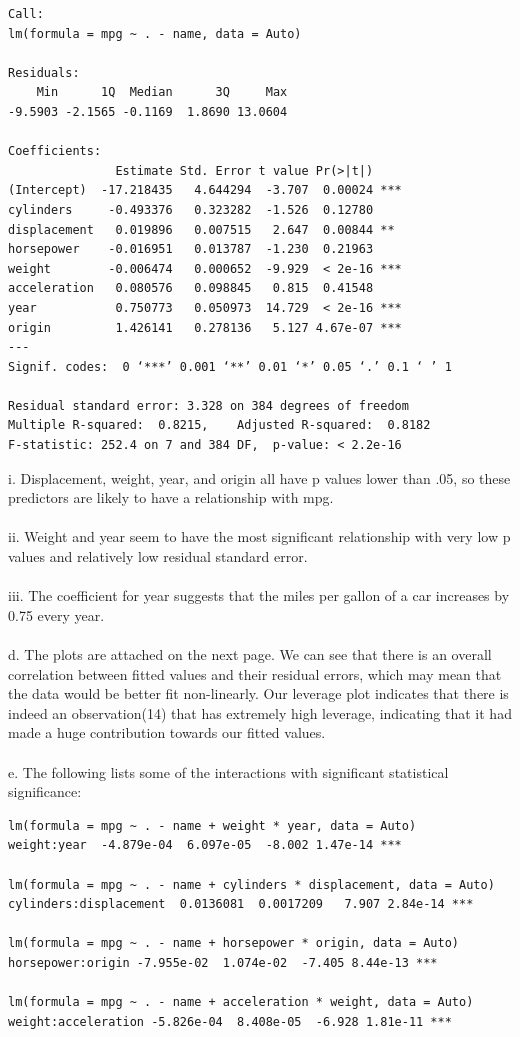 \documentclass[12pt]{article}
\begin{document}
\begin{lstlisting}
Call:
lm(formula = mpg ~ . - name, data = Auto)

Residuals:
    Min      1Q  Median      3Q     Max 
-9.5903 -2.1565 -0.1169  1.8690 13.0604 

Coefficients:
               Estimate Std. Error t value Pr(>|t|)    
(Intercept)  -17.218435   4.644294  -3.707  0.00024 ***
cylinders     -0.493376   0.323282  -1.526  0.12780    
displacement   0.019896   0.007515   2.647  0.00844 ** 
horsepower    -0.016951   0.013787  -1.230  0.21963    
weight        -0.006474   0.000652  -9.929  < 2e-16 ***
acceleration   0.080576   0.098845   0.815  0.41548    
year           0.750773   0.050973  14.729  < 2e-16 ***
origin         1.426141   0.278136   5.127 4.67e-07 ***
---
Signif. codes:  0 ‘***’ 0.001 ‘**’ 0.01 ‘*’ 0.05 ‘.’ 0.1 ‘ ’ 1

Residual standard error: 3.328 on 384 degrees of freedom
Multiple R-squared:  0.8215,    Adjusted R-squared:  0.8182 
F-statistic: 252.4 on 7 and 384 DF,  p-value: < 2.2e-16
\end{lstlisting}
\newpage
i. 	Displacement, weight, year, and origin all have p values lower than .05, so these predictors are likely to have a relationship with mpg.
\\ \\
ii. Weight and year seem to have the most significant relationship with very low p values and relatively low residual standard error.
\\ \\
iii. The coefficient for year suggests that the miles per gallon of a car increases by 0.75 every year.
\\ \\
d. The plots are attached on the next page. We can see that there is an overall correlation between fitted values and their residual errors, which may mean that the data would be better fit non-linearly. Our leverage plot indicates that there is indeed an observation(14) that has extremely high leverage, indicating that it had made a huge contribution towards our fitted values.
\\ \\
e. The following lists some of the interactions with significant statistical significance:
\begin{lstlisting}
lm(formula = mpg ~ . - name + weight * year, data = Auto)
weight:year  -4.879e-04  6.097e-05  -8.002 1.47e-14 ***

lm(formula = mpg ~ . - name + cylinders * displacement, data = Auto)
cylinders:displacement  0.0136081  0.0017209   7.907 2.84e-14 ***

lm(formula = mpg ~ . - name + horsepower * origin, data = Auto)
horsepower:origin -7.955e-02  1.074e-02  -7.405 8.44e-13 ***

lm(formula = mpg ~ . - name + acceleration * weight, data = Auto)
weight:acceleration -5.826e-04  8.408e-05  -6.928 1.81e-11 ***
\end{lstlisting}
\end{document}
